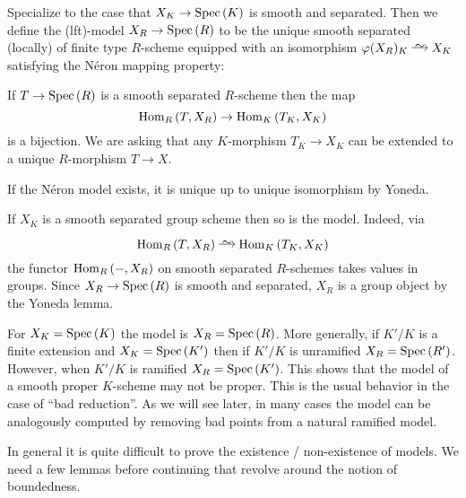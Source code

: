 \documentclass[12pt]{article}
\begin{document}
\newcommand{\sh}{\mathrm{sh}}


Specialize to the case that $X_K \to \mathrm{Spec}\left( K \right)$ is smooth and separated. Then we define the {(lft)-\Neron model} $X_R \to \mathrm{Spec}\left( R \right)$ to be the unique smooth separated (locally) of finite type $R$-scheme equipped with an isomorphism $\varphi (X_R)_K \iso X_K$ satisfying the N\'{e}ron mapping property:
\begin{center}
If $T \to \mathrm{Spec}\left( R \right)$ is a smooth separated $R$-scheme then the map
\[ \mathrm{Hom}_{R} \left( T, X_R \right) \to \mathrm{Hom}_{K} \left( T_K, X_K \right) \]
is a bijection. We are asking that any $K$-morphism $T_K \to X_K$ can be extended to a unique $R$-morphism $T \to X$. 
\end{center} 

If the N\'{e}ron model exists, it is unique up to unique isomorphism by Yoneda. 

\begin{rmk}
If $X_K$ is a smooth separated group scheme then so is the \Neron model. Indeed, via
\[ \Hom{R}{T}{X_R} \iso \Hom{K}{T_K}{X_K} \]
the functor $\mathrm{Hom}_{R} \left( -, X_R \right)$ on smooth separated $R$-schemes takes values in groups. Since $X_R \to \mathrm{Spec}\left( R \right)$ is smooth and separated, $X_R$ is a group object by the Yoneda lemma.  
\end{rmk}

\begin{example}
For $X_K = \mathrm{Spec}\left( K \right)$ the \Neron model is $X_R = \mathrm{Spec}\left( R \right)$. More generally, if $K' / K$ is a finite extension and $X_K = \mathrm{Spec}\left( K' \right)$ then if $K'/K$ is unramified $X_R = \mathrm{Spec}\left( R' \right)$. However, when $K'/K$ is ramified $X_R = \mathrm{Spec}\left( K' \right)$. This shows that the \Neron model of a smooth proper $K$-scheme may not be proper. This is the usual behavior in the case of ``bad reduction''. As we will see later, in many cases the \Neron model can be analogously computed by removing bad points from a natural ramified model.
\end{example}

In general it is quite difficult to prove the existence / non-existence of \Neron models. We need a few lemmas before continuing that revolve around the notion of boundedness.
\end{document}
